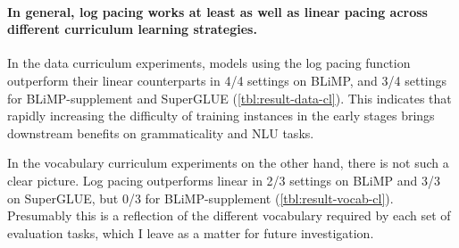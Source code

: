 \paragraph{In general, log pacing works at least as well as linear pacing across different curriculum learning strategies.}
In the data curriculum experiments, models using the log pacing function outperform their linear counterparts in 4/4 settings on BLiMP, and 3/4 settings for BLiMP-supplement and SuperGLUE (\cref{tbl:result-data-cl}). This indicates that rapidly increasing the difficulty of training instances in the early stages brings downstream benefits on grammaticality and NLU tasks.

In the vocabulary curriculum experiments on the other hand, there is not such a clear picture. Log pacing outperforms linear in 2/3 settings on BLiMP and 3/3 on SuperGLUE, but 0/3 for BLiMP-supplement (\cref{tbl:result-vocab-cl}). Presumably this is a reflection of the different vocabulary required by each set of evaluation tasks, which I leave as a matter for future investigation.







